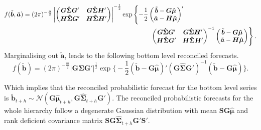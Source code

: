 \documentclass[a4paper, 11pt]{article}
\theoremstyle{theo}
\theoremstyle{definition}
\begin{document}
\begin{align*}
f(\tilde{\bm{b}},\tilde{\bm{a}})&
=(2\pi)^{-\frac{n}{2}}\left|
\begin{pmatrix}
  \bm{G}\bm{\hat{\Sigma}}\bm{G}' & \bm{G}\bm{\hat{\Sigma}}\bm{H}' \\
  \bm{H}\bm{\hat{\Sigma}}\bm{G}' & \bm{H}\bm{\hat{\Sigma}}\bm{H}'
\end{pmatrix}
\right|^{-\frac{1}{2}}
\exp \left\{-\frac{1}{2} \begin{pmatrix}\tilde{\bm{b}} - \bm{G}\bm{\hat{\mu}}\\ \tilde{\bm{a}}- \bm{H}\bm{\hat{\mu}}\end{pmatrix}'\right.\\
&\hspace*{7cm}
\left.\begin{pmatrix}
\bm{G}\bm{\hat{\Sigma}}\bm{G}' & \bm{G}\bm{\hat{\Sigma}}\bm{H}' \\
\bm{H}\bm{\hat{\Sigma}}\bm{G}' & \bm{H}\bm{\hat{\Sigma}}\bm{H}'
\end{pmatrix}^{-1}
\begin{pmatrix}\tilde{\bm{b}} - \bm{G}\bm{\hat{\mu}}\\ \tilde{\bm{a}}- \bm{H}\bm{\hat{\mu}}\end{pmatrix} \right\}.
\end{align*}
Marginalising out $\tilde{\bm{a}}$, leads to the following bottom level reconciled forecasts. 
\begin{equation}\label{ex:2.1}
f(\tilde{\bm{b}})=(2\pi)^{-\frac{m}{2}}\Big|\bm{G}\bm{\hat{\Sigma}}\bm{G}'\Big|^{\frac{1}{2}}
\exp \Big\{-\frac{1}{2} (\tilde{\bm{b}} - \bm{G}\bm{\hat{\mu}})' (\bm{G}\bm{\hat{\Sigma}}\bm{G}')^{-1}(\tilde{\bm{b}} - \bm{G}\bm{\hat{\mu}}) \Big\}.
\end{equation}

Which implies that the reconciled probabilistic forecast for the bottom level series is $\tilde{\bm{b}}_{t+h} \sim \mathcal{N}(\bm{G}\bm{\hat{\mu}}_{t+h}, \bm{G}\hat{\bm{\Sigma}}_{t+h}\bm{G}')$.  The reconciled probabilistic forecasts for the whole hierarchy follow a degenerate Gaussian distribution with mean  $\bm{SG}\bm{\hat{\mu}}$ and rank deficient covariance matrix $\bm{SG}\hat{\bm{\Sigma}}_{t+h}\bm{G}'\bm{S}'$.
\end{document}

